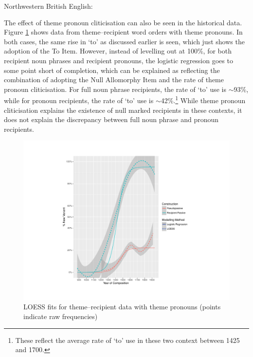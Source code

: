 	\begin{exe}
		 Northwestern British English:
		\begin{xlist}
	\end{xlist}
	\end{exe}

	The effect of theme pronoun cliticisation can also be seen in the historical data. Figure \ref{fig:brit-tr} shows data from theme--recipient word orders with theme pronouns. In both cases, the same rise in `to' as discussed earlier is seen, which just shows the adoption of the To Item. However, instead of levelling out at 100\%, for both recipient noun phrases and recipient pronouns, the logistic regression goes to some point short of completion, which can be explained as reflecting the combination of adopting the Null Allomorphy Item and the rate of theme pronoun cliticisation. For full noun phrase recipients, the rate of `to' use is $\sim$93\%, while for pronoun recipients, the rate of `to' use is $\sim$42\%.\footnote{These reflect the average rate of `to' use in these two context between 1425 and 1700.} While theme pronoun cliticisation explains the existence of null marked recipients in these contexts, it does not explain the discrepancy between full noun phrase and pronoun recipients.

	\begin{figure}[ht!]
		\includegraphics[width=\linewidth]{../images/brit-tp}
		\caption{LOESS fits for theme--recipient data with theme pronouns (points indicate raw frequencies)}
		\label{fig:brit-tr}
	\end{figure}

